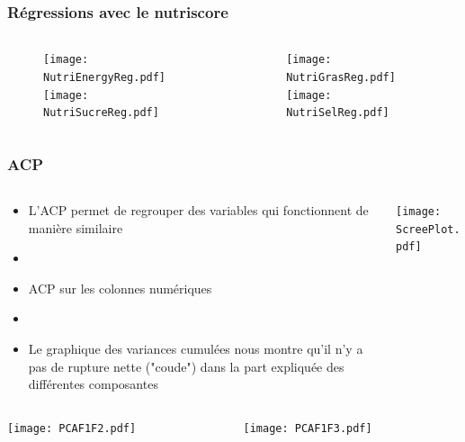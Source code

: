 \subsubsection{Régressions avec le nutriscore}
\begin{frame}{\insertsubsubsection}
  \begin{columns}
    \begin{column}{.5\textwidth}
      \begin{figure}
        \texttt{[image: NutriEnergyReg.pdf]}
        \texttt{[image: NutriSucreReg.pdf]}
      \end{figure}
    \end{column}
    \begin{column}{.5\textwidth}
      \begin{figure}
        \texttt{[image: NutriGrasReg.pdf]}
        \texttt{[image: NutriSelReg.pdf]}
      \end{figure}
    \end{column}
  \end{columns}
\end{frame}

\subsubsection{ACP}
\begin{frame}{\insertsubsubsection}
  \begin{columns}
    \begin{column}{.5\textwidth}
      \begin{itemize}
        \item L'ACP permet de regrouper des variables qui fonctionnent de manière similaire
        \item[]
        \item ACP sur les colonnes numériques
        \item[]
        \item Le graphique des variances cumulées nous montre qu'il n'y a pas de rupture nette ("coude")
              dans la part expliquée des différentes composantes
      \end{itemize}
    \end{column}
    \begin{column}{.5\textwidth}
      \texttt{[image: ScreePlot.pdf]}
    \end{column}
  \end{columns}
\end{frame}

\begin{frame}
  \begin{columns}
    \begin{column}{.5\textwidth}
      \texttt{[image: PCAF1F2.pdf]}
    \end{column}
    \begin{column}{.5\textwidth}
      \texttt{[image: PCAF1F3.pdf]}
    \end{column}
  \end{columns}
\end{frame}

